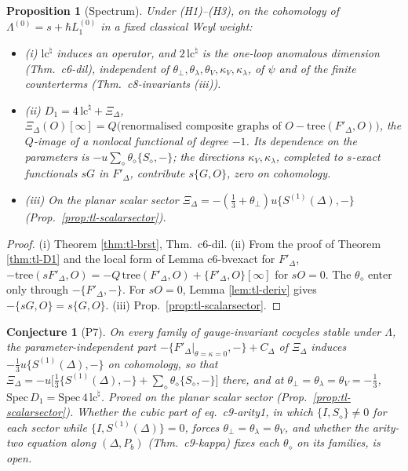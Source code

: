 \documentclass[11pt]{article}
\numberwithin{equation}{section}
\theoremstyle{plain}
\newtheorem{proposition}[theorem]{Proposition}
\newtheorem{conjecture}[theorem]{Conjecture}
\theoremstyle{definition}
\begin{document}
\begin{proposition}[Spectrum]
\label{prop:tl-spec}
Under (H1)--(H3), on the cohomology of $\Lambda^{(0)}=s+\hbar L_1^{(0)}$ in a fixed classical Weyl weight:
\begin{itemize}
\item (i) $\mathrm{lc}^\natural$ induces an operator, and $2\,\mathrm{lc}^\natural$ is the one-loop anomalous dimension (Thm.~c6-dil), independent of $\theta_\perp,\theta_\lambda,\theta_V,\kappa_V,\kappa_\lambda$, of $\psi$ and of the finite counterterms (Thm.~c8-invariants (iii)).
\item (ii) $D_1=4\,\mathrm{lc}^\natural+\Xi_\Delta$, $\Xi_\Delta(O)[\infty]=Q\big(\text{renormalised composite graphs of }O-\mathrm{tree}(F'_\Delta,O)\big)$, the $Q$-image of a nonlocal functional of degree $-1$. Its dependence on the parameters is $-u\sum_\diamond\theta_\diamond\{S_\diamond,-\}$; the directions $\kappa_V,\kappa_\lambda$, completed to $s$-exact functionals $sG$ in $F'_\Delta$, contribute $s\{G,O\}$, zero on cohomology.
\item (iii) On the planar scalar sector $\Xi_\Delta=-(\tfrac13+\theta_\perp)u\{S^{(1)}(\Delta),-\}$ (Prop.~\ref{prop:tl-scalarsector}).
\end{itemize}
\end{proposition}

\begin{proof}
(i) Theorem \ref{thm:tl-brst}, Thm.~c6-dil. (ii) From the proof of Theorem \ref{thm:tl-D1} and the local form of Lemma c6-bvexact for $F'_\Delta$, $-\mathrm{tree}(sF'_\Delta,O)=-Q\,\mathrm{tree}(F'_\Delta,O)+\{F'_\Delta,O\}[\infty]$ for $sO=0$. The $\theta_\diamond$ enter only through $-\{F'_\Delta,-\}$. For $sO=0$, Lemma \ref{lem:tl-deriv} gives $-\{sG,O\}=s\{G,O\}$. (iii) Prop.~\ref{prop:tl-scalarsector}.
\end{proof}

\begin{conjecture}[P7]
\label{conj:tl-P7}
On every family of gauge-invariant cocycles stable under $\Lambda$, the parameter-independent part $-\{F'_\Delta|_{\theta=\kappa=0},-\}+C_\Delta$ of $\Xi_\Delta$ induces $-\tfrac13u\{S^{(1)}(\Delta),-\}$ on cohomology, so that $\Xi_\Delta=-u\big[\tfrac13\{S^{(1)}(\Delta),-\}+\sum_\diamond\theta_\diamond\{S_\diamond,-\}\big]$ there, and at $\theta_\perp=\theta_\lambda=\theta_V=-\tfrac13$, $\mathrm{Spec}\,D_1=\mathrm{Spec}\,4\,\mathrm{lc}^\natural$. Proved on the planar scalar sector (Prop.~\ref{prop:tl-scalarsector}). Whether the cubic part of eq.~c9-arity1, in which $\{I,S_\diamond\}\ne0$ for each sector while $\{I,S^{(1)}(\Delta)\}=0$, forces $\theta_\perp=\theta_\lambda=\theta_V$, and whether the arity-two equation along $(\Delta,P_b)$ (Thm.~c9-kappa) fixes each $\theta_\diamond$ on its families, is open.
\end{conjecture}
\end{document}
